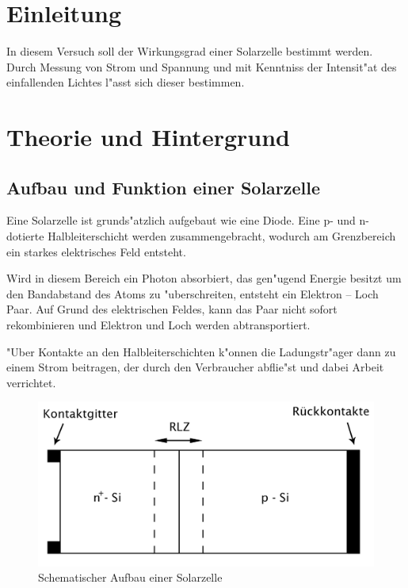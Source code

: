 \section{Einleitung}
	\label{sec:einleitung}
	In diesem Versuch soll der Wirkungsgrad einer Solarzelle bestimmt werden.
	Durch Messung von Strom und Spannung und mit Kenntniss der Intensit"at des einfallenden Lichtes l"asst sich dieser bestimmen.


\section{Theorie und Hintergrund}
	\label{sec:theorie}

	\subsection{Aufbau und Funktion einer Solarzelle}
		\label{subsec:aufbau_funktion}
		Eine Solarzelle ist grunds"atzlich aufgebaut wie eine Diode.
		Eine p- und n-dotierte Halbleiterschicht werden zusammengebracht, wodurch am Grenzbereich ein starkes elektrisches Feld entsteht.

		Wird in diesem Bereich ein Photon absorbiert, das gen"ugend Energie besitzt um den Bandabstand des Atoms zu "uberschreiten, entsteht ein Elektron -- Loch Paar.
		Auf Grund des elektrischen Feldes, kann das Paar nicht sofort rekombinieren und Elektron und Loch werden abtransportiert.

		"Uber Kontakte an den Halbleiterschichten k"onnen die Ladungstr"ager dann zu einem Strom beitragen, der durch den Verbraucher abflie"st und dabei Arbeit verrichtet.

		\begin{figure}[h]
			\centering
			\includegraphics[width = 15cm]{img/diode_neu.jpg}
			\caption{Schematischer Aufbau einer Solarzelle}
			\label{fig:diode}
		\end{figure}

